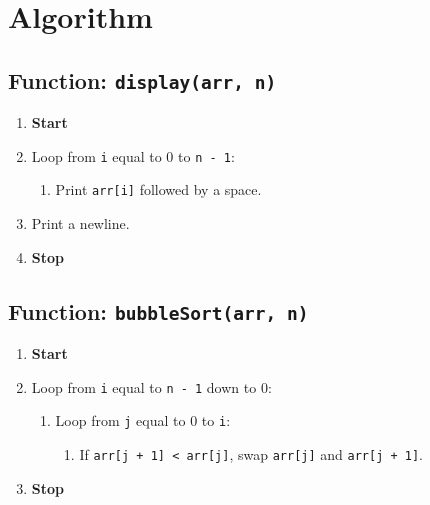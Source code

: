 \section{Algorithm}
 {\selectfont

  \subsection{Function: \texttt{display(arr, n)}}
  \begin{enumerate}[label*=\arabic*.]
    \item \textbf{Start}
    \item Loop from \texttt{i} equal to 0 to \texttt{n - 1}:
          \begin{enumerate}[label*=\arabic*.]
            \item Print \texttt{arr[i]} followed by a space.
          \end{enumerate}
    \item Print a newline.
    \item \textbf{Stop}
  \end{enumerate}

  \subsection{Function: \texttt{bubbleSort(arr, n)}}
  \begin{enumerate}[label*=\arabic*.]
    \item \textbf{Start}
    \item Loop from \texttt{i} equal to \texttt{n - 1} down to 0:
          \begin{enumerate}[label*=\arabic*.]
            \item Loop from \texttt{j} equal to 0 to \texttt{i}:
                  \begin{enumerate}[label*=\arabic*.]
                    \item If \texttt{arr[j + 1] < arr[j]}, swap \texttt{arr[j]} and \texttt{arr[j + 1]}.
                  \end{enumerate}
          \end{enumerate}
    \item \textbf{Stop}
  \end{enumerate}

}
